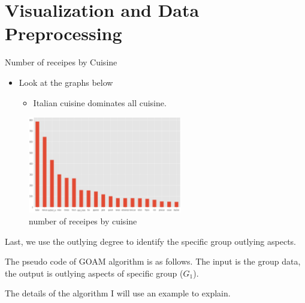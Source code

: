 \documentclass[
 size=14pt,
 paper=smartboard,  %
 mode=present, 		%
 display=slides, 	%
 style=tuliplab,  	%
 pauseslide,
 fleqn,leqno]{powerdot}
\begin{document}
  \section{Visualization and Data Preprocessing}
  \begin{slide}{Number of receipes by Cuisine}
    \begin{itemize}
      \item
      Look at the graphs below 
      \begin{itemize}
        \item
        Italian cuisine dominates all cuisine.
        
       
        \end{itemize}
      \end{itemize}
      
      \begin{figure}
        \centering
        \includegraphics[width=0.6\textwidth,natwidth=866,natheight=550]{figures/ns.eps}
        \caption{number of receipes by cuisine}\label{Checking for outliers}
      \end{figure}
      
      \begin{note}
      Last,
      we use the outlying degree to identify the specific group outlying aspects.
      
      The pseudo code of GOAM algorithm is as follows.
      The input is the group data,
      the output is outlying aspects of specific group ($G_1$).
      
      The details of the algorithm I will use an example to explain.
      \end{note}
  
  \end{slide}
\end{document}
